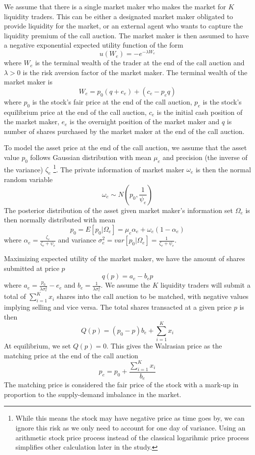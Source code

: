 We assume that there is a single market maker who makes the market for $K$ liquidity traders. This can be either a designated market maker obligated to provide liquidity for the market, or an external agent who wants to capture the liquidity premium of the call auction. The market maker is then assumed to have a negative exponential expected utility function of the form
\[
  u(W_e) = -e^{-\lambda W_e}
\]
where $W_e$ is the terminal wealth of the trader at the end of the call auction and $\lambda>0$ is the risk aversion factor of the market maker. The terminal wealth of the market maker is
\[
  W_e = p_0 (q + e_e) + (c_e - p_e q)
\]
where $p_0$ is the stock's fair price at the end of the call auction, $p_e$ is the stock's equilibrium price at the end of the call auction, $c_e$ is the initial cash position of the market maker, $e_e$ is the overnight position of the market maker and $q$ is number of shares purchased by the market maker at the end of the call auction.

To model the asset price at the end of the call auction, we assume that the asset value $p_0$ follows Gaussian distribution with mean $\mu_e$ and precision (the inverse of the variance) $\zeta_e$ \footnote{While this means the stock may have negative price as time goes by, we can ignore this risk as we only need to account for one day of variance. Using an arithmetic stock price process instead of the classical logarihmic price process simplifies other calculation later in the study.}. The private information of market maker $\omega_e$ is then the normal random variable
\[
  \omega_e \sim N(p_0, \frac{1}{\psi_e})
\]
The posterior distribution of the asset given market maker's information set $\Omega_e$ is then normally distributed with mean
\[
  p_0=E[p_0|\Omega_e]=\mu_e \alpha_e + \omega_e(1 - \alpha_e)
\]
where $\alpha_e = \frac{\zeta_e}{\zeta_e+\psi_e}$ and variance $\sigma_e^2=var[p_0|\Omega_e]=\frac{1}{\zeta_e+\psi_e}$.

Maximizing expected utility of the market maker, we have the amount of shares submitted at price $p$
\begin{equation}\label{eqn:mm_eval_eqb}
  q(p) = a_e - b_e p
\end{equation}
where $a_e = \frac{p_0}{\lambda \sigma_e^2} - e_e$ and $b_e=\frac{1}{\lambda \sigma_e^2}$. We assume the $K$ liquidity traders will submit a total of $\sum_{i=1}^K x_i$ shares into the call auction to be matched, with negative values implying selling and vice versa. The total shares transacted at a given price $p$ is then
\[
  Q(p) = (p_0 - p) b_e + \sum_{i=1}^K x_i
\]
At equilibrium, we set $Q(p)=0$. This gives the Walrasian price as the matching price at the end of the call auction
\begin{equation}\label{markup_px_eqb}
  p_e = p_0 + \frac{\sum_{i=1}^K x_i}{b_e}
\end{equation}
The matching price is considered the fair price of the stock with a mark-up in proportion to the supply-demand imbalance in the market.

